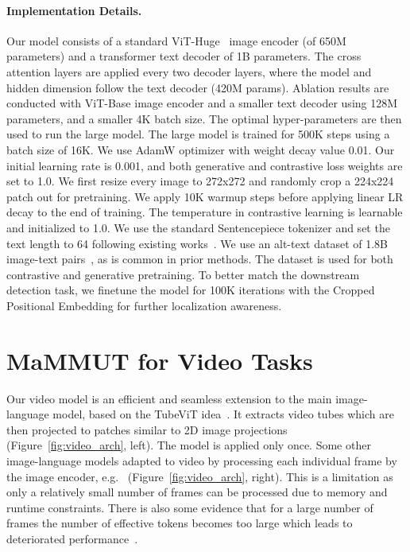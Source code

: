 \documentclass[10pt]{article} \usepackage[accepted]{tmlr}
\newcommand{\ours}{MaMMUT\xspace}
\begin{document}
\paragraph{Implementation Details.}\quad 
Our model consists of a standard ViT-Huge~\citep{dosovitskiy2020image,ScalingViTs} image encoder (of 650M parameters) and a transformer text decoder of 1B parameters. The cross attention layers are applied every two decoder layers, where the model and hidden dimension follow the text decoder (420M params). Ablation results are conducted with ViT-Base image encoder and a smaller text decoder using 128M parameters, and a smaller 4K batch size. The optimal hyper-parameters are then used to run the large model. The large model is trained for 500K steps using a batch size of 16K. We use AdamW optimizer with weight decay value 0.01. Our initial learning rate is 0.001, and both generative and contrastive loss weights are set to 1.0.  We first resize every image to 272x272 and randomly crop a 224x224 patch out for pretraining. We apply 10K warmup steps before applying linear LR decay to the end of training. The temperature in contrastive learning is learnable and initialized to 1.0. We use the standard Sentencepiece tokenizer and set the text length to 64 following existing works~\citep{align,yu2022coca}. We use an alt-text dataset of 1.8B image-text pairs~\citep{align}, as is common in prior methods. The dataset is used for both contrastive and generative pretraining. To better match the downstream detection task, we finetune the model for 100K iterations with the Cropped Positional Embedding for further localization awareness. 
















\section{\ours for Video Tasks}
\label{sec:video_sec}


Our video model is an efficient and seamless extension to the main image-language model, based on the TubeViT idea~\citep{piergiovanni2022tubevit}. It extracts video tubes which are then projected to patches similar to 2D image projections (Figure~\ref{fig:video_arch}, left). The model is applied only once. Some other image-language models adapted to video by processing each individual frame by the image encoder, e.g.~\citep{wang2022git,dynpretr,videococa} (Figure~\ref{fig:video_arch}, right). This is a limitation as only a relatively small number of frames can be processed due to memory and runtime constraints. There is also some evidence that for a large number of frames the number of effective tokens becomes too large which leads to deteriorated performance~\citep{piergiovanni2022tubevit}.
\end{document}
